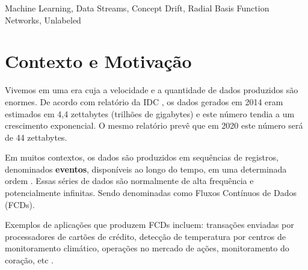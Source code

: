 \documentclass[qual, classic, a4paper]{ufbathesis}
\begin{document}
\abstract

\blindtext

\begin{keywords}
    Machine Learning, Data Streams, Concept Drift, Radial Basis Function Networks, Unlabeled
\end{keywords}


\tableofcontents

\listoffigures

\listoftables

\mainmatter

% 
% 
% 
%

 \label{introducao}

\section{Contexto e Motivação}
 
Vivemos em uma era cuja a velocidade e a quantidade de dados produzidos são enormes.
De acordo com relatório da IDC \cite{idc_report}, 
os dados gerados em 2014 eram estimados em 4,4 zettabytes (trilhões de gigabytes) e este número tendia a um crescimento exponencial. 
O mesmo relatório prevê que em 2020 este número será de 44 zettabytes.

Em muitos contextos, os dados são produzidos em sequências de registros, denominados \textbf{eventos}, 
disponíveis ao longo do tempo, em uma determinada ordem \cite{Feigenbaum:2003:ALD:589343.592594}. 
Essas séries de dados são normalmente de alta frequência e potencialmente infinitas.
Sendo denominadas como Fluxos Contínuos de Dados (FCDs).

Exemplos de aplicações que produzem FCDs incluem: transações enviadas por processadores de cartões de crédito, 
detecção de temperatura por centros de monitoramento climático, operações no mercado de ações, monitoramento do coração, 
etc \cite{Aggarwal:2003:FCE:1315451.1315460}.
\end{document}
